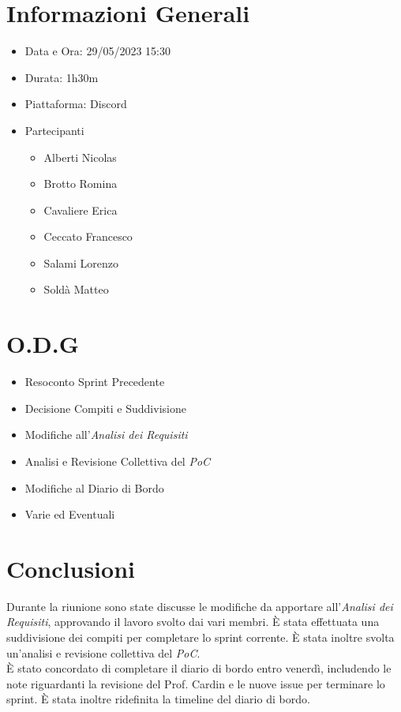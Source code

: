 \documentclass[a4paper, 12pt]{article}
\begin{document}
\makefrontpage

\section*{Informazioni Generali}
\begin{itemize}
    \item Data e Ora: 29/05/2023 15:30
    \item Durata: 1h30m
    \item Piattaforma: Discord
    \item Partecipanti
    \begin{itemize}
        \item Alberti Nicolas
        \item Brotto Romina
        \item Cavaliere Erica
        \item Ceccato Francesco
        \item Salami Lorenzo
        \item Soldà Matteo
    \end{itemize}
\end{itemize}

\section*{O.D.G}
\begin{itemize}
    \item Resoconto Sprint Precedente
    \item Decisione Compiti e Suddivisione
    \item Modifiche all'\textit{Analisi dei Requisiti}
    \item Analisi e Revisione Collettiva del \textit{PoC}
    \item Modifiche al Diario di Bordo
    \item Varie ed Eventuali
\end{itemize}

\section*{Conclusioni}
Durante la riunione sono state discusse le modifiche da apportare all'\textit{Analisi dei Requisiti}, approvando il lavoro svolto dai vari membri. È stata effettuata una suddivisione dei compiti per completare lo sprint corrente. È stata inoltre svolta un'analisi e revisione collettiva del \textit{PoC}.\\
È stato concordato di completare il diario di bordo entro venerdì, includendo le note riguardanti la revisione del Prof. Cardin e le nuove issue per terminare lo sprint. È stata inoltre ridefinita la timeline del diario di bordo.
\end{document}

